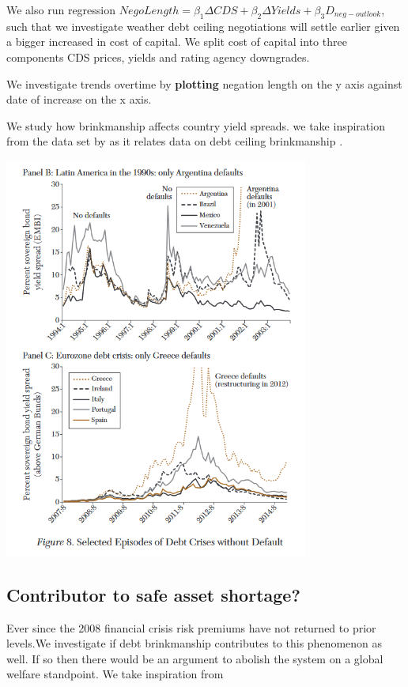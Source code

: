 \documentclass[
  12pt]{article}
\begin{document}
We also run regression
\(NegoLength=\beta_1\Delta CDS+\beta_2\Delta Yields+\beta_3D_{neg-outlook}\),
such that we investigate weather debt ceiling negotiations will settle
earlier given a bigger increased in cost of capital. We split cost of
capital into three components CDS prices, yields and rating agency
downgrades.

We investigate trends overtime by \textbf{plotting} negation length on
the y axis against date of increase on the x axis.

We study how brinkmanship affects country yield spreads. we take
inspiration from the data set by \citep{meyer2022} as it relates data on
debt ceiling brinkmanship \citep{reinhart2008}.

\includegraphics[width=3.94792in,height=\textheight]{style-guide/overtime_brink_2.png}

\hypertarget{contributor-to-safe-asset-shortage}{%
\subsection{Contributor to safe asset
shortage?}\label{contributor-to-safe-asset-shortage}}

Ever since the 2008 financial crisis risk premiums have not returned to
prior levels\citep{caballero2017}.We investigate if debt brinkmanship
contributes to this phenomenon as well. If so then there would be an
argument to abolish the system on a global welfare standpoint. We take
inspiration from
\end{document}
